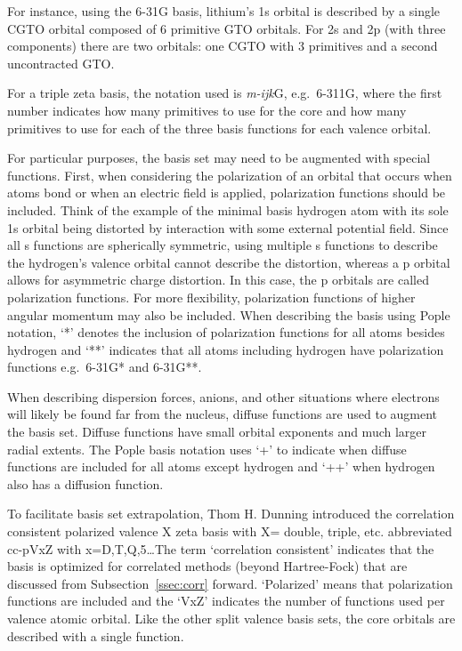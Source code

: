 \documentclass[11pt,oneside,final]{huthesis}%
\begin{document}
For instance, using the 6-31G basis, lithium's 1s orbital is described by a single CGTO orbital composed of 6 primitive GTO orbitals.  For 2s and 2p (with three components) there are two orbitals: one CGTO with 3 primitives and a second uncontracted GTO.

For a triple zeta basis, the notation used is \textit{m-ijk}G, e.g.~6-311G, where the first number indicates how many primitives to use for the core and how many primitives to use for each of the three basis functions for each valence orbital.

For particular purposes, the basis set may need to be augmented with special functions.   First, when considering the polarization of an orbital that occurs when atoms bond or when an electric field is applied, polarization functions should be included.  Think of the example of the minimal basis hydrogen atom with its sole 1s orbital being distorted by interaction with some external potential field.  Since all s functions are spherically symmetric, using multiple s functions to describe the hydrogen's valence orbital cannot describe the distortion, whereas a p orbital allows for asymmetric charge distortion.  In this case, the p orbitals are called {polarization functions}. For more flexibility, polarization functions of higher angular momentum may also be included.   When describing the basis using Pople notation, `*' denotes the inclusion of polarization functions for all atoms besides hydrogen and `**' indicates that all atoms including hydrogen have polarization functions e.g.~6-31G* and 6-31G**.

When describing dispersion forces, anions, and other situations where electrons will likely be found far from the nucleus, diffuse functions are used to augment the basis set.  {Diffuse functions} have small orbital exponents and much larger radial extents.  The Pople basis notation uses `+' to indicate when diffuse functions are included for all atoms except hydrogen and `++' when hydrogen also has a diffusion function.

To facilitate basis set extrapolation, Thom H. Dunning introduced the correlation consistent polarized valence X zeta basis with X= double, triple, etc. abbreviated cc-pVxZ with x=D,T,Q,5\dots  The term `correlation consistent' indicates that the basis is optimized for correlated methods (beyond Hartree-Fock) that are discussed from Subsection~\ref{ssec:corr} forward. `Polarized' means that polarization functions are included and the `VxZ' indicates the number of functions used per valence atomic orbital.  Like the other split valence basis sets, the core orbitals are described with a single function. 
\end{document}
